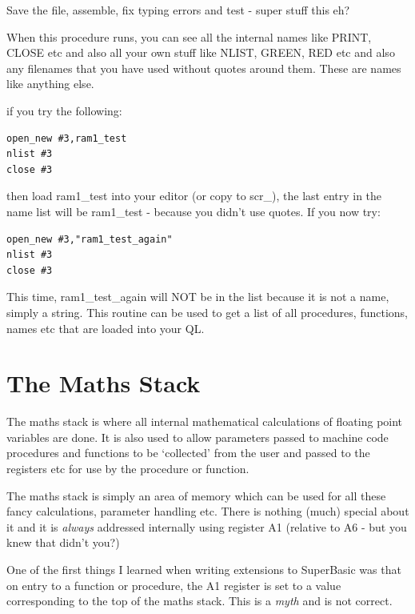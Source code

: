 Save the file, assemble, fix typing errors and test -{} super stuff
    this eh?

When this procedure runs, you can see all the internal names like
    PRINT, CLOSE etc and also all your own stuff like NLIST, GREEN, RED etc
    and also any filenames that you have used without quotes around them.
    These are names like anything else.

if you try the following:

\begin{lstlisting}[firstnumber=1,]
open_new #3,ram1_test
nlist #3
close #3
\end{lstlisting}

then load ram1\_test into your editor (or copy to scr\_), the last
    entry in the name list will be ram1\_test -{} because you didn't use quotes.
    If you now try:

\begin{lstlisting}[firstnumber=1,]
open_new #3,"ram1_test_again"
nlist #3
close #3
\end{lstlisting}

This time, ram1\_test\_again will NOT be in the list because it is not
    a name, simply a string. This routine can be used to get a list of all
    procedures, functions, names etc that are loaded into your QL.

\section{The Maths Stack}
\label{ch7-maths-stack}%

The maths stack is where all internal mathematical calculations of
    floating point variables are done. It is also used to allow parameters
    passed to machine code procedures and functions to be `collected' from the
    user and passed to the registers etc for use by the procedure or
    function.

The maths stack is simply an area of memory which can be used for
    all these fancy calculations, parameter handling etc. There is nothing
    (much) special about it and it is \emph{always} addressed internally using
    register A1 (relative to A6 -{} but you knew that didn't you?)

One of the first things I learned when writing extensions to
    SuperBasic was that on entry to a function or procedure, the A1 register
    is set to a value corresponding to the top of the maths stack. This is a
    \emph{myth} and is not correct.

